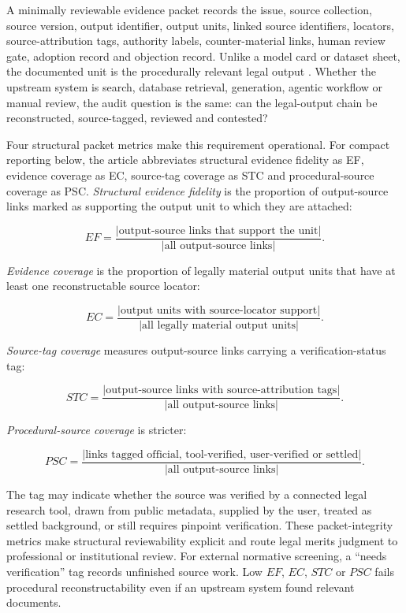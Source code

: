 \documentclass[12pt,a4paper]{article}
\begin{document}
A minimally reviewable evidence packet records the issue, source collection, source version, output identifier, output units, linked source identifiers, locators, source-attribution tags, authority labels, counter-material links, human review gate, adoption record and objection record. Unlike a model card or dataset sheet, the documented unit is the procedurally relevant legal output \citep{gebru2021,mitchell2019}. Whether the upstream system is search, database retrieval, generation, agentic workflow or manual review, the audit question is the same: can the legal-output chain be reconstructed, source-tagged, reviewed and contested?

Four structural packet metrics make this requirement operational. For compact reporting below, the article abbreviates structural evidence fidelity as EF, evidence coverage as EC, source-tag coverage as STC and procedural-source coverage as PSC. \textit{Structural evidence fidelity} is the proportion of output-source links marked as supporting the output unit to which they are attached:

\[
EF=\frac{|\text{output-source links that support the unit}|}{|\text{all output-source links}|}.
\]

\textit{Evidence coverage} is the proportion of legally material output units that have at least one reconstructable source locator:

\[
EC=\frac{|\text{output units with source-locator support}|}{|\text{all legally material output units}|}.
\]

\textit{Source-tag coverage} measures output-source links carrying a verification-status tag:

\[
STC=\frac{|\text{output-source links with source-attribution tags}|}{|\text{all output-source links}|}.
\]

\textit{Procedural-source coverage} is stricter:

\[
PSC=\frac{|\text{links tagged official, tool-verified, user-verified or settled}|}{|\text{all output-source links}|}.
\]

The tag may indicate whether the source was verified by a connected legal research tool, drawn from public metadata, supplied by the user, treated as settled background, or still requires pinpoint verification. These packet-integrity metrics make structural reviewability explicit and route legal merits judgment to professional or institutional review. For external normative screening, a ``needs verification'' tag records unfinished source work. Low $EF$, $EC$, $STC$ or $PSC$ fails procedural reconstructability even if an upstream system found relevant documents.
\end{document}

